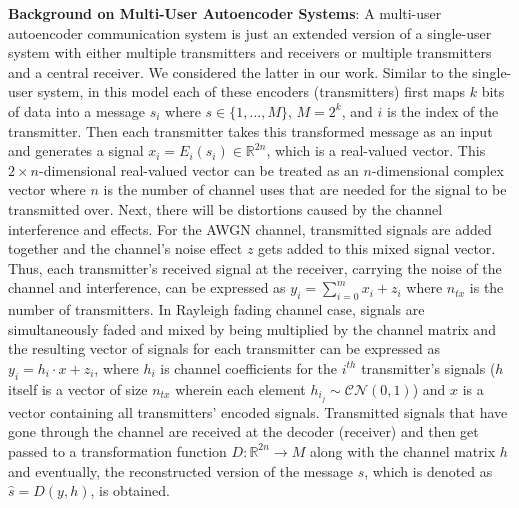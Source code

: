 \textbf{Background on Multi-User Autoencoder Systems}: A multi-user autoencoder communication system is just an extended version of a single-user system with either multiple transmitters and receivers or multiple transmitters and a central receiver. We considered the latter in our work. Similar to the single-user system, in this model each of these encoders (transmitters) first maps \(k\) bits of data into a message \(s_i\) where \(s \in \{1,...,M\}\), \(M = 2^k\), and \(i\) is the index of the transmitter. Then each transmitter takes this transformed message as an input and generates a signal \(x_i = E_i(s_i) \in \mathbb{R}^{2n}\), which is a real-valued vector. This \(2 \times n\)-dimensional real-valued vector can be treated as an \(n\)-dimensional complex vector where \(n\) is the number of channel uses that are needed for the signal to be transmitted over. Next, there will be distortions caused by the channel interference and effects. For the AWGN channel, transmitted signals are added together and the channel's noise effect \(z\) gets added to this mixed signal vector. Thus, each transmitter's received signal at the receiver, carrying the noise of the channel and interference, can be expressed as \(y_i = \sum_{i=0}^{m}x_i + z_i\) where \(n_{tx}\) is the number of transmitters. In Rayleigh fading channel case, signals are simultaneously faded and mixed by being multiplied by the channel matrix and the resulting vector of signals for each transmitter can be expressed as \(y_i = h_i \cdot x + z_i\), where \(h_i\) is channel coefficients for the \(i^{th}\) transmitter's signals (\(h\) itself is a vector of size \(n_{tx}\) wherein each element \(h_{i_j}\sim \mathcal{CN}(0, 1)\)) and \(x\) is a vector containing all transmitters' encoded signals. Transmitted signals that have gone through the channel are received at the decoder (receiver) and then get passed to a transformation function \(D: \mathbb{R}^{2n} \rightarrow M \) along with the channel matrix \(h\) and eventually, the reconstructed version of the message \(s\), which is denoted as \(\hat{s} = D(y, h)\), is obtained.

